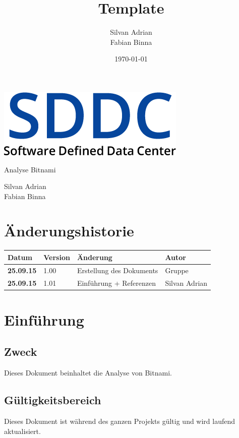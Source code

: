 \documentclass[11pt]{scrartcl}
\title{Template}
\author{Silvan Adrian \\ Fabian Binna}
\date{\today{}}
\begin{document}
\def\arraystretch{1.5}
\begin{titlepage}
\begin{center}
\vspace{10em}
\includegraphics[scale=2]{SDDC}
\vspace{10em}
\end{center}
\begin{center}
\huge {Analyse Bitnami}
\end{center}
\begin{center}
\vspace{10em}
\LARGE {Silvan Adrian} \\
\LARGE {Fabian Binna}
\end{center}

\end{titlepage}

\newpage
\section{Änderungshistorie}
\begin{tabularx}{\linewidth}{l l X l}
\textbf{Datum} & \textbf{Version} & \textbf{Änderung}  & \textbf{Autor} \\
\hline
\textbf{25.09.15} & 1.00 & Erstellung des Dokuments & Gruppe \\
\textbf{25.09.15} & 1.01 & Einführung + Referenzen & Silvan Adrian \\
\end{tabularx}

\newpage
\tableofcontents
\newpage

\section{Einführung}
\subsection{Zweck}
Dieses Dokument beinhaltet die Analyse von Bitnami.
\subsection{Gültigkeitsbereich}
Dieses Dokument ist während des ganzen Projekts gültig und wird laufend aktualisiert.
\end{document}
